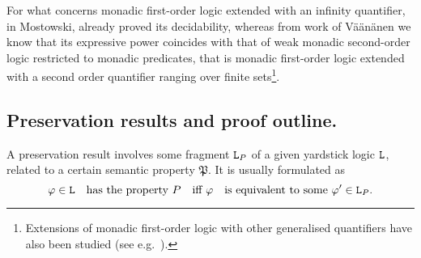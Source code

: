 For what concerns monadic first-order logic extended with an infinity quantifier,
in \cite{Mostowski1957} Mostowski, already proved its decidability, whereas from 
work of V\"a\"an\"anen  \cite{vaananen77} we know that its expressive power 
coincides with that of weak monadic second-order logic restricted to monadic 
predicates, that is monadic first-order logic extended with a second order 
quantifier ranging over finite sets\footnote{%
   Extensions of monadic first-order logic with other generalised quantifiers
   have also been studied (see 
   e.g.~\cite{slomson1968monadic,caicedo1981extensions}).
   }.


\subsection*{Preservation results and proof outline.}

A preservation result involves some fragment $\mathtt{L}_{\relax{P}}$ of a given
yardstick logic $\mathtt{L}$, related to a certain semantic property $\mathfrak{P}$. 
It is usually formulated as
\begin{equation}\label{eq:intro-0}
\phi  \in \llang \text{ has the property } \mathfrak{P} \text{ iff } 
\phi \text{ is equivalent to some } \phi' \in \llang_{\mathfrak{P}}.
\end{equation}

